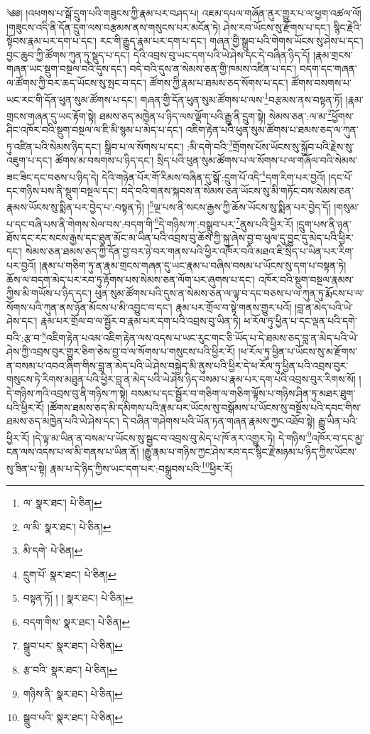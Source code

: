 \setcounter{footnote}{0} 
༄༅། །འཕགས་པ་སྒོ་དྲུག་པའི་གཟུངས་ཀྱི་རྣམ་པར་བཤད་པ། འཇམ་དཔལ་གཞོན་ནུར་གྱུར་པ་ལ་ཕྱག་འཚལ་ལོ། །གཟུངས་འདི་ནི་དོན་དྲུག་ལས་བརྩམས་ནས་གསུངས་པར་མངོན་ཏེ། ཤེས་རབ་ཡོངས་སུ་རྫོགས་པ་དང་། སྙིང་རྗེའི་སྟོབས་རྣམ་པར་དག་པ་དང་། རང་གི་རྒྱུད་རྣམ་པར་དག་པ་དང་། གཞན་གྱི་སྒྲུབ་པའི་གེགས་ཡོངས་སུ་ཤེས་པ་དང་། བྱང་ཆུབ་ཀྱི་ཚོགས་ཀུན་ཏུ་སྡུད་པ་དང་། དེའི་འབྲས་བུ་ཡང་དག་པའི་ཡེ་ཤེས་དང་དེ་བཞིན་ཉིད་དོ། །རྣམ་གྲངས་གཞན་ཡང་སྡུག་བསྔལ་བའི་དུས་དང་། བདེ་བའི་དུས་ན་སེམས་ཅན་གྱི་ཁམས་འཛིན་པ་དང་། བདག་དང་གཞན་ལ་ཚོགས་ཀྱི་བར་ཆད་ཡོངས་སུ་སྤང་བ་དང་། ཚོགས་ཀྱི་རྣམ་པ་ཐམས་ཅད་སོགས་པ་དང་། ཚོགས་བསགས་པ་ཡང་རང་གི་དོན་ཕུན་སུམ་ཚོགས་པ་དང་། གཞན་གྱི་དོན་ཕུན་སུམ་ཚོགས་པ་ལས་\footnote{ལ་  སྣར་ཐང་།  པེ་ཅིན། }བརྩམས་ནས་བསྟན་ཏོ། །རྣམ་གྲངས་གཞན་དུ་ཡང་རྟོག་སྟེ། ཐམས་ཅད་མཁྱེན་པ་ཉིད་ལས་ལྡོག་པའི་རྒྱུ་ནི་དྲུག་སྟེ། སེམས་ཅན་:ལ་མ་\footnote{ལ་མི་  སྣར་ཐང་།  པེ་ཅིན། }ཕྱོགས་ཤིང་འཁོར་བའི་སྡུག་བསྔལ་ལ་ཇི་མི་སྙམ་པ་མེད་པ་དང་། འཇིག་རྟེན་པའི་ཕུན་སུམ་ཚོགས་པ་ཐམས་ཅད་ལ་ཀུན་ཏུ་འཛིན་པའི་སེམས་ཉིད་དང་། སྒྲིབ་པ་ལ་སོགས་པ་དང་། :མི་དགེ་བའི་\footnote{མི་དགེ་  པེ་ཅིན། }གྲོགས་པོས་ཡོངས་སུ་སྐྱོབ་པའི་རྗེས་སུ་འཇུག་པ་དང་། ཚོགས་མ་བསགས་པ་ཉིད་དང་། སྲིད་པའི་ཕུན་སུམ་ཚོགས་པ་ལ་སོགས་པ་ལ་གཞོལ་བའི་སེམས་ཟང་ཟིང་དང་བཅས་པ་ཉིད་དེ། དེའི་གཉེན་པོར་གོ་རིམས་བཞིན་དུ་སྒོ་:དྲུག་པོ་འདི་\footnote{དྲུག་པོ་  སྣར་ཐང་།  པེ་ཅིན། }དག་རིག་པར་བྱའོ། །དང་པོ་དང་གཉིས་པས་ནི་སྡུག་བསྔལ་དང་། བདེ་བའི་གནས་སྐབས་ན་སེམས་ཅན་ཡོངས་སུ་མི་གཏོང་བས་སེམས་ཅན་རྣམས་ཡོངས་སུ་སྨིན་པར་བྱེད་པ་:བསྟན་ཏེ། །\footnote{བསྟན་ཏོ། ། །  སྣར་ཐང་།  པེ་ཅིན། }ལྔ་པས་ནི་སངས་རྒྱས་ཀྱི་ཆོས་ཡོངས་སུ་སྨིན་པར་བྱེད་དོ། །གསུམ་པ་དང་བཞི་པས་ནི་གེགས་སེལ་བས་:བདག་གི་\footnote{བདག་གིས་  སྣར་ཐང་།  པེ་ཅིན། }དེ་གཉིས་ཀ་:བསྒྲུབ་པར་\footnote{སྒྲུབ་པར་  སྣར་ཐང་།  པེ་ཅིན། }ནུས་པའི་ཕྱིར་རོ། །དྲུག་པས་ནི་ཉན་ཐོས་དང་རང་སངས་རྒྱས་དང་ཐུན་མོང་མ་ཡིན་པའི་འབྲས་བུ་ཆོས་ཀྱི་སྐུ་ཞེས་བྱ་བ་ཕུལ་དུ་བྱུང་དུ་མེད་པའི་ཕྱིར་དང་། སེམས་ཅན་ཐམས་ཅད་ཀྱི་དོན་བྱ་བར་ཉེ་བར་གནས་པའི་ཕྱིར་འཁོར་བའི་མཐའ་ཇི་སྲིད་པ་ཡིན་པར་རིག་པར་བྱའོ། །རྣམ་པ་གཅིག་ཏུ་ན་རྣམ་གྲངས་གཞན་དུ་ཡང་རྣམ་པ་བཞིས་བསམ་པ་ཡོངས་སུ་དག་པ་བསྟན་ཏེ། ཆོས་ལ་བདག་མེད་པར་རབ་ཏུ་རྟོགས་པས་སེམས་ཅན་ལོག་པར་ཞུགས་པ་དང་། འཁོར་བའི་སྡུག་བསྔལ་རྣམས་ཀྱིས་མི་གཡོས་པ་ཉིད་དང་། ཕུན་སུམ་ཚོགས་པའི་དུས་ན་སེམས་ཅན་ལ་ལྟ་བ་དང་བཅས་པ་ལ་ཀུན་ཏུ་རྨོངས་པ་ལ་སོགས་པའི་ཀུན་ནས་ཉོན་མོངས་པ་མི་འབྱུང་བ་དང་། རྣམ་པར་གྲོལ་བ་སྟེ་གནས་གྱུར་པའོ། །བླ་ན་མེད་པའི་ཡེ་ཤེས་དང་། རྣམ་པར་གྲོལ་བ་ལ་སྦྱོར་བ་རྣམ་པར་དག་པའི་འབྲས་བུ་ཡིན་ཏེ། ཕ་རོལ་ཏུ་ཕྱིན་པ་དང་ལྡན་པའི་དགེ་བའི་:རྩ་བ་\footnote{རྩ་བའི་  སྣར་ཐང་།  པེ་ཅིན། }འཇིག་རྟེན་པའམ་འཇིག་རྟེན་ལས་འདས་པ་ཡང་རུང་གང་ཅི་ཡོད་པ་དེ་ཐམས་ཅད་བླ་ན་མེད་པའི་ཡེ་ཤེས་ཀྱི་འབྲས་བུར་གྱུར་ཅིག་ཅེས་བྱ་བ་ལ་སོགས་པ་གསུངས་པའི་ཕྱིར་རོ། །ཕ་རོལ་ཏུ་ཕྱིན་པ་ཡོངས་སུ་མ་རྫོགས་ན་བསམ་པ་འབའ་ཞིག་གིས་བླ་ན་མེད་པའི་ཡེ་ཤེས་བསྐྱེད་མི་ནུས་པའི་ཕྱིར་དེ་ཕ་རོལ་ཏུ་ཕྱིན་པའི་འབྲས་བུར་གསུངས་ཏེ་རིགས་མཐུན་པའི་ཕྱིར་བླ་ན་མེད་པའི་ཡེ་ཤེས་ཉིད་བསམ་པ་རྣམ་པར་དག་པའི་འབྲས་བུར་རིགས་སོ། །དེ་གཉིས་ཀའི་འབྲས་བུ་ནི་གཉིས་ཀ་སྟེ། བསམ་པ་དང་སྦྱོར་བ་གཅིག་ལ་གཅིག་ལྟོས་པ་གཉིས་ཤིན་ཏུ་མཐར་ཐུག་པའི་ཕྱིར་རོ། །ཚོགས་ཐམས་ཅད་མི་དམིགས་པའི་རྣམ་པར་ཡོངས་སུ་བསྒོམས་པ་ཡོངས་སུ་བསྔོས་པའི་དབང་གིས་ཐམས་ཅད་མཁྱེན་པའི་ཡེ་ཤེས་དང་། དེ་བཞིན་གཤེགས་པའི་ཡོན་ཏན་གཞན་རྣམས་ཀྱང་འཐོབ་སྟེ། རྒྱུ་ཡིན་པའི་ཕྱིར་རོ། །དེ་ལྟ་མ་ཡིན་ན་བསམ་པ་ཡོངས་སུ་སྦྱང་བ་འབྲས་བུ་མེད་པ་ཁོ་ནར་འགྱུར་ཏེ། དེ་གཉིས་\footnote{གཉིས་ནི་  སྣར་ཐང་།  པེ་ཅིན། }འཁོར་བ་དང་མྱ་ངན་ལས་འདས་པ་ལ་མི་གནས་པ་ཡིན་ནོ། །རྒྱུ་རྣམ་པ་གཉིས་ཀྱང་ཤེས་རབ་དང་སྙིང་རྗེ་མཉམ་པ་ཉིད་ཀྱིས་ཡོངས་སུ་ཟིན་པ་སྟེ། རྣམ་པ་དེ་ཉིད་ཀྱིས་ཡང་དག་པར་:བསྒྲུབས་པའི་\footnote{སྒྲུབ་པའི་  སྣར་ཐང་།  པེ་ཅིན། }ཕྱིར་རོ། 